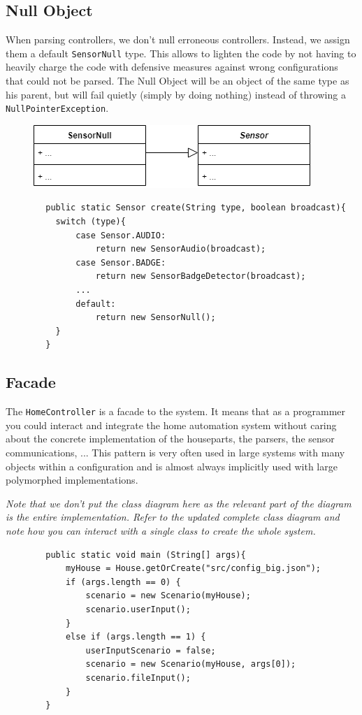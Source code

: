       \subsection{Null Object}
        When parsing controllers, we don't null erroneous controllers. Instead, we assign them a default \texttt{SensorNull} type. This allows to lighten the code by not having to heavily charge the code with defensive measures against wrong configurations that could not be parsed. The Null Object will be an object of the same type as his parent, but will fail quietly (simply by doing nothing) instead of throwing a \texttt{NullPointerException}.
        \begin{figure}[!h]
          \includegraphics[scale=0.75]{nullsensor.png}
        \end{figure}
        \begin{verbatim}
        public static Sensor create(String type, boolean broadcast){
          switch (type){
              case Sensor.AUDIO:
                  return new SensorAudio(broadcast);
              case Sensor.BADGE:
                  return new SensorBadgeDetector(broadcast);
              ...
              default:
                  return new SensorNull();
          }
        }
        \end{verbatim}
      \subsection{Facade}
        The \texttt{HomeController} is a facade to the system. It means that as a programmer you could interact and integrate the home automation system without caring about the concrete implementation of the houseparts, the parsers, the sensor communications, ... This pattern is very often used in large systems with many objects within a configuration and is almost always implicitly used with large polymorphed implementations.
        
        \emph{Note that we don't put the class diagram here as the relevant part of the diagram is the entire implementation. Refer to the updated complete class diagram and note how you can interact with a single class to create the whole system.}

        \begin{verbatim}
        public static void main (String[] args){
            myHouse = House.getOrCreate("src/config_big.json");
            if (args.length == 0) {
                scenario = new Scenario(myHouse);
                scenario.userInput();
            }
            else if (args.length == 1) {
                userInputScenario = false;
                scenario = new Scenario(myHouse, args[0]);
                scenario.fileInput();
            }
        }
        \end{verbatim}
